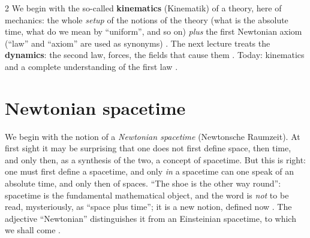 \begin{paracol}{2}
We begin with the so-called \textbf{kinematics} (Kinematik) of a theory, here of mechanics: the whole \emph{setup} of the notions
of the theory (what is the absolute time, what do we mean by ``uniform'', and so on) \emph{plus} the first Newtonian axiom (``law'' and ``axiom'' are used as synonyms)
. The next lecture treats the \textbf{dynamics}: the second law, forces, the fields that cause them .
Today: kinematics and a complete understanding of the first law .

\section{Newtonian spacetime}\label{sec:nk-spacetime}

We begin with the notion of a \emph{Newtonian spacetime} (Newtonsche Raumzeit). At first sight it may be surprising that one does not first
define space, then time, and only then, as a synthesis of the two, a concept of spacetime. But this is right: one must first define a
spacetime, and only \emph{in} a spacetime can one speak of an absolute time, and only then of spaces. ``The shoe is the other way round'': spacetime
is the fundamental mathematical object, and the word is \emph{not} to be read, mysteriously, as ``space plus time''; it is a new notion, defined now
. The adjective ``Newtonian'' distinguishes it from an Einsteinian spacetime, to which we shall come .


\end{paracol}
